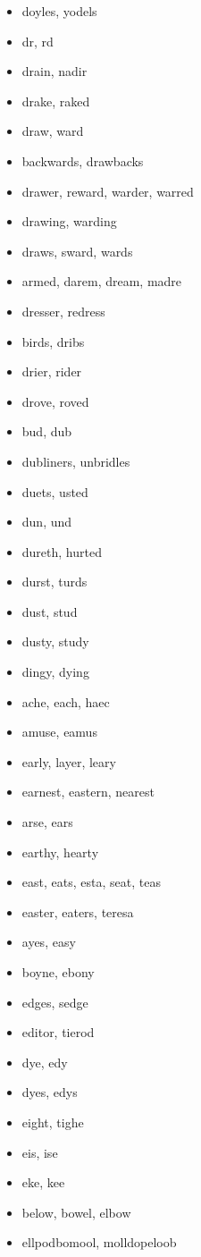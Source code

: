 \documentclass[a4wide,11pt]{report}
\begin{document}
\begin{itemize}
  \item doyles, yodels
  \item dr, rd
  \item drain, nadir
  \item drake, raked
  \item draw, ward
  \item backwards, drawbacks
  \item drawer, reward, warder, warred
  \item drawing, warding
  \item draws, sward, wards
  \item armed, darem, dream, madre
  \item dresser, redress
  \item birds, dribs
  \item drier, rider
  \item drove, roved
  \item bud, dub
  \item dubliners, unbridles
  \item duets, usted
  \item dun, und
  \item dureth, hurted
  \item durst, turds
  \item dust, stud
  \item dusty, study
  \item dingy, dying
  \item ache, each, haec
  \item amuse, eamus
  \item early, layer, leary
  \item earnest, eastern, nearest
  \item arse, ears
  \item earthy, hearty
  \item east, eats, esta, seat, teas
  \item easter, eaters, teresa
  \item ayes, easy
  \item boyne, ebony
  \item edges, sedge
  \item editor, tierod
  \item dye, edy
  \item dyes, edys
  \item eight, tighe
  \item eis, ise
  \item eke, kee
  \item below, bowel, elbow
  \item ellpodbomool, molldopeloob

\end{itemize}
\end{document}
